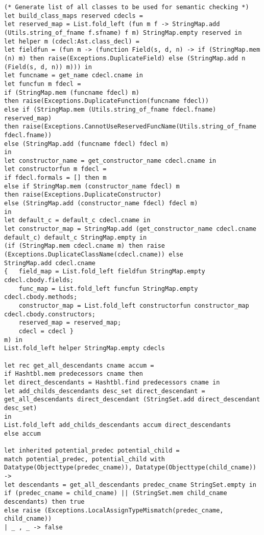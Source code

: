 \begin{verbatim}
(* Generate list of all classes to be used for semantic checking *)
let build_class_maps reserved cdecls =
let reserved_map = List.fold_left (fun m f -> StringMap.add (Utils.string_of_fname f.sfname) f m) StringMap.empty reserved in
let helper m (cdecl:Ast.class_decl) =  
let fieldfun = (fun m -> (function Field(s, d, n) -> if (StringMap.mem (n) m) then raise(Exceptions.DuplicateField) else (StringMap.add n (Field(s, d, n)) m))) in
let funcname = get_name cdecl.cname in
let funcfun m fdecl = 
if (StringMap.mem (funcname fdecl) m) 
then raise(Exceptions.DuplicateFunction(funcname fdecl)) 
else if (StringMap.mem (Utils.string_of_fname fdecl.fname) reserved_map)
then raise(Exceptions.CannotUseReservedFuncName(Utils.string_of_fname fdecl.fname))
else (StringMap.add (funcname fdecl) fdecl m)	
in
let constructor_name = get_constructor_name cdecl.cname in
let constructorfun m fdecl = 
if fdecl.formals = [] then m
else if StringMap.mem (constructor_name fdecl) m 
then raise(Exceptions.DuplicateConstructor) 
else (StringMap.add (constructor_name fdecl) fdecl m)
in
let default_c = default_c cdecl.cname in
let constructor_map = StringMap.add (get_constructor_name cdecl.cname default_c) default_c StringMap.empty in
(if (StringMap.mem cdecl.cname m) then raise (Exceptions.DuplicateClassName(cdecl.cname)) else
StringMap.add cdecl.cname 
{ 	field_map = List.fold_left fieldfun StringMap.empty cdecl.cbody.fields; 
	func_map = List.fold_left funcfun StringMap.empty cdecl.cbody.methods;
	constructor_map = List.fold_left constructorfun constructor_map cdecl.cbody.constructors; 
	reserved_map = reserved_map; 
	cdecl = cdecl } 
m) in
List.fold_left helper StringMap.empty cdecls

let rec get_all_descendants cname accum = 
if Hashtbl.mem predecessors cname then
let direct_descendants = Hashtbl.find predecessors cname in
let add_childs_descendants desc_set direct_descendant = 
get_all_descendants direct_descendant (StringSet.add direct_descendant desc_set)
in
List.fold_left add_childs_descendants accum direct_descendants
else accum

let inherited potential_predec potential_child = 
match potential_predec, potential_child with 
Datatype(Objecttype(predec_cname)), Datatype(Objecttype(child_cname)) -> 
let descendants = get_all_descendants predec_cname StringSet.empty in
if (predec_cname = child_cname) || (StringSet.mem child_cname descendants) then true 
else raise (Exceptions.LocalAssignTypeMismatch(predec_cname, child_cname))
| _ , _ -> false


\end{verbatim}
